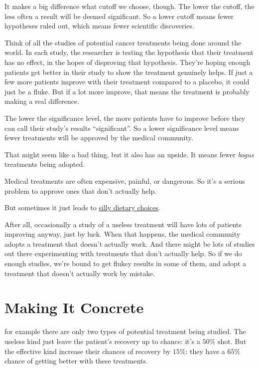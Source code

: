 \documentclass[justified]{tufte-book}
\theoremstyle{definition}
\theoremstyle{definition}
\theoremstyle{definition}
\theoremstyle{remark}
\begin{document}
It makes a big difference what cutoff we choose, though. The lower the
cutoff, the less often a result will be deemed significant. So a lower
cutoff means fewer hypotheses ruled out, which means fewer scientific
discoveries.

Think of all the studies of potential cancer treatments being done
around the world. In each study, the researcher is testing the
hypothesis that their treatment has no effect, in the hopes of
disproving that hypothesis. They're hoping enough patients get better in
their study to show the treatment genuinely helps. If just a few more
patients improve with their treatment compared to a placebo, it could
just be a fluke. But if a lot more improve, that means the treatment is
probably making a real difference.

The lower the significance level, the more patients have to improve
before they can call their study's results ``significant''. So a lower
significance level means fewer treatments will be approved by the
medical community.

That might seem like a bad thing, but it also has an upside. It means
fewer \emph{bogus} treatments being adopted.

\begin{marginfigure}
Medical treatments are often expensive, painful, or dangerous. So it's a
serious problem to approve ones that don't actually help.

But sometimes it just leads to \href{https://xkcd.com/882/}{silly
dietary choices}.
\end{marginfigure}

After all, occasionally a study of a useless treatment will have lots of
patients improving anyway, just by luck. When that happens, the medical
community adopts a treatment that doesn't actually work. And there might
be lots of studies out there experimenting with treatments that don't
actually help. So if we do enough studies, we're bound to get flukey
results in some of them, and adopt a treatment that doesn't actually
work by mistake.

\hypertarget{making-it-concrete}{%
\section{Making It Concrete}\label{making-it-concrete}}

 for example there are only two types of potential
treatment being studied. The useless kind just leave the patient's
recovery up to chance: it's a \(50\%\) shot. But the effective kind
increase their chances of recovery by \(15\%\): they have a \(65\%\)
chance of getting better with these treatments.
\end{document}
